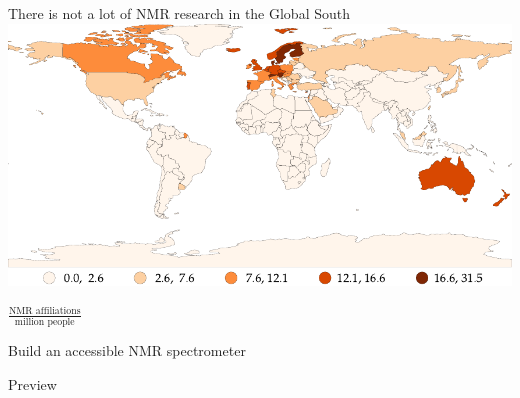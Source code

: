\documentclass{ethpresentation}
\begin{document}
\begin{frame}{There is not a lot of NMR research in the Global South}
  \centering
  \includegraphics[height=0.8\textheight]{images/nmr-affiliations-per-million-people_naturalbreaks.pdf}

  \(\frac{\text{NMR affiliations}}{\text{million people}}\)
\end{frame}

\begin{frame}[standout]
  Build an accessible NMR spectrometer
\end{frame}

\begin{frame}{Preview}
  \tableofcontents
\end{frame}


\end{document}
